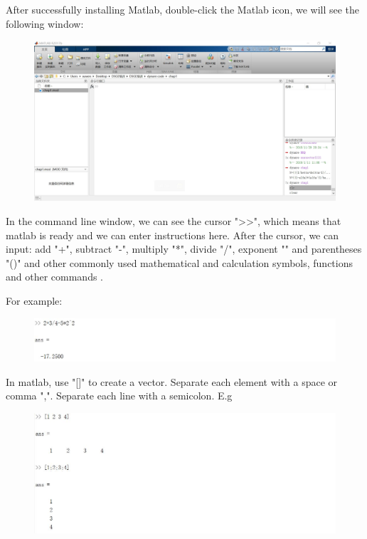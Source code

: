 \documentclass[10pt,math=newtx,citestyle=gb7714-2015,bibstyle=gb7714-2015]{elegantbook}
\begin{document}
{{{	After successfully installing Matlab, double-click the Matlab icon, we will see the following window:
	\begin{figure}[htbp!]
		\centering
		\includegraphics[width=0.8\linewidth]{FIG/matlab.jpg}
		
	\end{figure}
	
	In the command line window, we can see the cursor ">>", which means that matlab is ready and we can enter instructions here. After the cursor, we can input: add "+", subtract "-", multiply "*", divide "/", exponent "" and parentheses "()" and other commonly used mathematical and calculation symbols, functions and other commands .
	
	For example:
	\begin{figure}[htbp!]
		\centering
		\includegraphics[width=0.8\linewidth]{FIG/calculate.jpg}
		
	\end{figure}
	
	In matlab, use "[]" to create a vector. Separate each element with a space or comma ",". Separate each line with a semicolon. E.g
	\begin{figure}[htbp!]
		\centering
		\includegraphics[width=0.8\linewidth]{FIG/vector.jpg}
		
	\end{figure}
	
}}}
\end{document}
